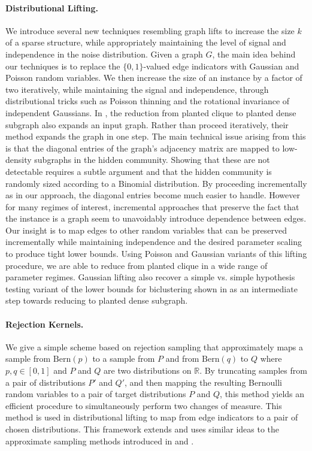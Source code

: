 \paragraph{Distributional Lifting.} We introduce several new techniques resembling graph lifts to increase the size $k$ of a sparse structure, while appropriately maintaining the level of signal and independence in the noise distribution. Given a graph $G$, the main idea behind our techniques is to replace the $\{0, 1\}$-valued edge indicators with Gaussian and Poisson random variables. We then increase the size of an instance by a factor of two iteratively, while maintaining the signal and independence, through distributional tricks such as Poisson thinning and the rotational invariance of independent Gaussians. In \cite{hajek2015computational}, the reduction from planted clique to planted dense subgraph also expands an input graph. Rather than proceed iteratively, their method expands the graph in one step. The main technical issue arising from this is that the diagonal entries of the graph's adjacency matrix are mapped to low-density subgraphs in the hidden community. Showing that these are not detectable requires a subtle argument and that the hidden community is randomly sized according to a Binomial distribution. By proceeding incrementally as in our approach, the diagonal entries become much easier to handle. However for many regimes of interest, incremental approaches that preserve the fact that the instance is a graph seem to unavoidably introduce dependence between edges. Our insight is to map edges to other random variables that can be preserved incrementally while maintaining independence and the desired parameter scaling to produce tight lower bounds. Using Poisson and Gaussian variants of this lifting procedure, we are able to reduce from planted clique in a wide range of parameter regimes. Gaussian lifting also recover a simple vs. simple hypothesis testing variant of the lower bounds for biclustering shown in \cite{ma2015computational} as an intermediate step towards reducing to planted dense subgraph.

\paragraph{Rejection Kernels.} We give a simple scheme based on rejection sampling that approximately maps a sample from $\text{Bern}(p)$ to a sample from $P$ and from $\text{Bern}(q)$ to $Q$ where $p, q \in [0, 1]$ and $P$ and $Q$ are two distributions on $\mathbb{R}$. By truncating samples from a pair of distributions $P'$ and $Q'$, and then mapping the resulting Bernoulli random variables to a pair of target distributions $P$ and $Q$, this method yields an efficient procedure to simultaneously perform two changes of measure. This method is used in distributional lifting to map from edge indicators to a pair of chosen distributions. This framework extends and uses similar ideas to the approximate sampling methods introduced in \cite{hajek2015computational} and \cite{ma2015computational}. 

